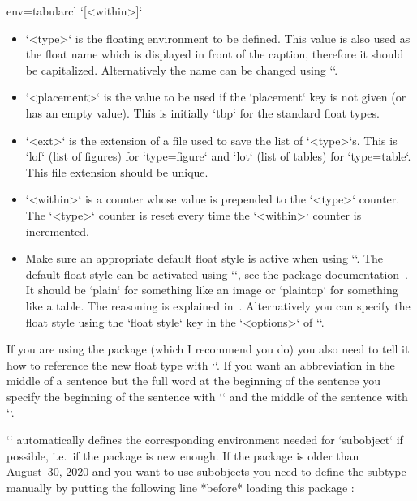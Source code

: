 \begin{tableobject}{env=tabular}{cl}
\DescribeMacro{\newfloat}
`[<within>]`
\begin{itemize}
\item `<type>` is the floating environment to be defined.
  This value is also used as the float name which is displayed in front of the caption, therefore it should be capitalized.
  Alternatively the name can be changed using ``.
\item `<placement>` is the value to be used if the `placement` key is not given (or has an empty value).
  This is initially `tbp` for the standard float types.
\item `<ext>` is the extension of a file used to save the list of `<type>`s.
  This is `lof` (list of figures) for `type=figure` and `lot` (list of tables) for `type=table`.
  This file extension should be unique.
\item `<within>` is a counter whose value is prepended to the `<type>` counter. The `<type>` counter is reset every time the `<within>` counter is incremented.
\item Make sure an appropriate default float style is active when using `\newfloat`.
  The default float style can be activated using ``, see the  package documentation~\autocite{float}.
  It should be `plain` for something like an image or `plaintop` for something like a table.
  The reasoning is explained in~\autocite{texexchange_caption_position}.
  Alternatively you can specify the float style using the `float style` key in the `<options>` of `\NewObjectStyle`.
\end{itemize}

\DescribeMacro{\crefname}
\DescribeMacro{\Crefname}
If you are using the  package (which I recommend you do) you also need to tell it how to reference the new float type with ``.
If you want an abbreviation in the middle of a sentence but the full word at the beginning of the sentence you specify the beginning of the sentence with `\Crefname` and the middle of the sentence with `\crefname`.

`\NewObjectStyle` automatically defines the corresponding environment needed for `subobject` if possible, i.e.\ if the  package is new enough.
If the  package is older than August~30, 2020 and you want to use subobjects you need to define the subtype manually by putting the following line *before* loading this package \autocite{texexchange_subtype_workaround}:
\begin{examplecode}
\end{examplecode}


\end{tableobject}
